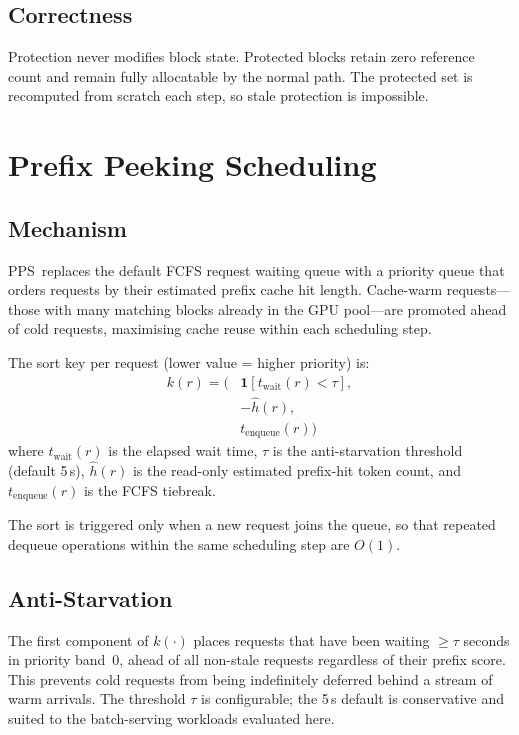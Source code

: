 \documentclass[journal]{IEEEtran}
\newcommand{\pps}{\textsc{PPS}}
\begin{document}
\subsection{Correctness}

Protection never modifies block state.  Protected blocks retain zero reference
count and remain fully allocatable by the normal path.  The protected set is
recomputed from scratch each step, so stale protection is impossible.

\section{Prefix Peeking Scheduling}
\label{sec:pps}

\subsection{Mechanism}

\pps\ replaces the default FCFS request waiting queue with a priority queue that
orders requests by their estimated prefix cache hit length.  Cache-warm
requests—those with many matching blocks already in the GPU pool—are promoted
ahead of cold requests, maximising cache reuse within each scheduling step.

The sort key per request (lower value = higher priority) is:
\begin{align}
  k(r) = \bigl(
    &\mathbf{1}[t_{\mathrm{wait}}(r) < \tau],\nonumber \\
    &-\hat{h}(r),\nonumber \\
    &t_{\mathrm{enqueue}}(r)
  \bigr)
  \label{eq:sortkey}
\end{align}
where $t_{\mathrm{wait}}(r)$ is the elapsed wait time, $\tau$ is the
anti-starvation threshold (default 5\,s), $\hat{h}(r)$ is the read-only
estimated prefix-hit token count, and $t_{\mathrm{enqueue}}(r)$ is the FCFS
tiebreak.

The sort is triggered only when a new request joins
the queue, so that repeated dequeue operations within the same scheduling
step are $O(1)$.

\subsection{Anti-Starvation}
\label{sec:antistarvation}

The first component of $k(\cdot)$ places requests that have been waiting
$\geq\tau$ seconds in priority band~0, ahead of all non-stale requests
regardless of their prefix score.  This prevents cold requests from being
indefinitely deferred behind a stream of warm arrivals.  The threshold
$\tau$ is configurable; the 5\,s default is conservative and suited to the
batch-serving workloads evaluated here.
\end{document}
